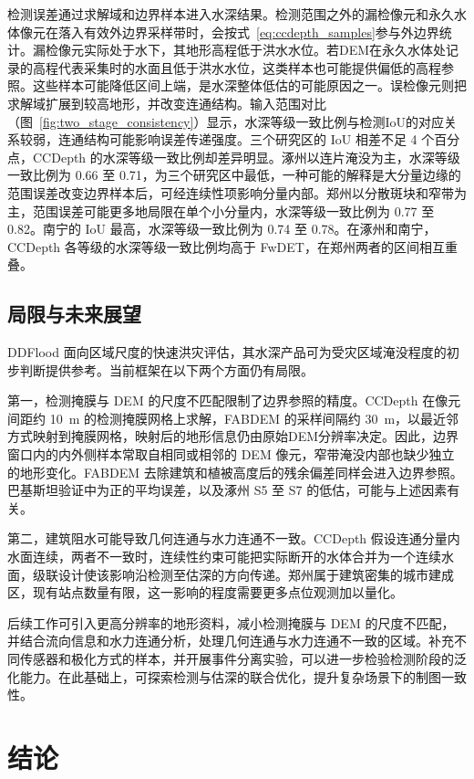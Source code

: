 \documentclass[authoryear,preprint,12pt]{elsarticle}
\begin{document}
检测误差通过求解域和边界样本进入水深结果。检测范围之外的漏检像元和永久水体像元在落入有效外边界采样带时，会按式~\eqref{eq:ccdepth_samples}参与外边界统计。漏检像元实际处于水下，其地形高程低于洪水水位。若DEM在永久水体处记录的高程代表采集时的水面且低于洪水水位，这类样本也可能提供偏低的高程参照。这些样本可能降低区间上端，是水深整体低估的可能原因之一。误检像元则把求解域扩展到较高地形，并改变连通结构。输入范围对比（图~\ref{fig:two_stage_consistency}）显示，水深等级一致比例与检测IoU的对应关系较弱，连通结构可能影响误差传递强度。三个研究区的 IoU 相差不足 4 个百分点，CCDepth 的水深等级一致比例却差异明显。涿州以连片淹没为主，水深等级一致比例为 0.66 至 0.71，为三个研究区中最低，一种可能的解释是大分量边缘的范围误差改变边界样本后，可经连续性项影响分量内部。郑州以分散斑块和窄带为主，范围误差可能更多地局限在单个小分量内，水深等级一致比例为 0.77 至 0.82。南宁的 IoU 最高，水深等级一致比例为 0.74 至 0.78。在涿州和南宁，CCDepth 各等级的水深等级一致比例均高于 FwDET，在郑州两者的区间相互重叠。

\subsection{局限与未来展望}

DDFlood 面向区域尺度的快速洪灾评估，其水深产品可为受灾区域淹没程度的初步判断提供参考。当前框架在以下两个方面仍有局限。

第一，检测掩膜与 DEM 的尺度不匹配限制了边界参照的精度。CCDepth 在像元间距约 10~m 的检测掩膜网格上求解，FABDEM 的采样间隔约 30~m，以最近邻方式映射到掩膜网格，映射后的地形信息仍由原始DEM分辨率决定。因此，边界窗口内的内外侧样本常取自相同或相邻的 DEM 像元，窄带淹没内部也缺少独立的地形变化。FABDEM 去除建筑和植被高度后的残余偏差同样会进入边界参照。巴基斯坦验证中为正的平均误差，以及涿州 S5 至 S7 的低估，可能与上述因素有关。

第二，建筑阻水可能导致几何连通与水力连通不一致。CCDepth 假设连通分量内水面连续，两者不一致时，连续性约束可能把实际断开的水体合并为一个连续水面，级联设计使该影响沿检测至估深的方向传递。郑州属于建筑密集的城市建成区，现有站点数量有限，这一影响的程度需要更多点位观测加以量化。

后续工作可引入更高分辨率的地形资料，减小检测掩膜与 DEM 的尺度不匹配，并结合流向信息和水力连通分析，处理几何连通与水力连通不一致的区域。补充不同传感器和极化方式的样本，并开展事件分离实验，可以进一步检验检测阶段的泛化能力。在此基础上，可探索检测与估深的联合优化，提升复杂场景下的制图一致性。

\section{结论}
\end{document}

